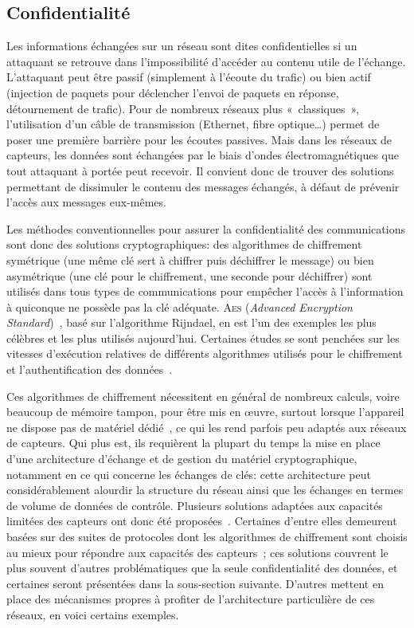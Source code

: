 \subsection{Confidentialité}

Les informations échangées sur un réseau sont dites confidentielles si un attaquant se retrouve dans l'impossibilité d'accéder au contenu utile de l'échange.
L'attaquant peut être passif (simplement à l'écoute du trafic) ou bien actif (injection de paquets pour déclencher l'envoi de paquets en réponse, détournement de trafic).
Pour de nombreux réseaux plus « classiques », l'utilisation d'un câble de transmission (Ethernet, fibre optique\dots) permet de poser une première barrière pour les écoutes passives.
Mais dans les réseaux de capteurs, les données sont échangées par le biais d'ondes électromagnétiques que tout attaquant à portée peut recevoir.
Il convient donc de trouver des solutions permettant de dissimuler le contenu des messages échangés, à défaut de prévenir l'accès aux messages eux-mêmes.

Les méthodes conventionnelles pour assurer la confidentialité des communications sont donc des solutions cryptographiques: des algorithmes de chiffrement symétrique (une même clé sert à chiffrer puis déchiffrer le message) ou bien asymétrique (une clé pour le chiffrement, une seconde pour déchiffrer) sont utilisés dans tous types de communications pour empêcher l'accès à l'information à quiconque ne possède pas la clé adéquate.
\textsc{Aes} (\textit{Advanced Encryption Standard})~\cite{aes}, basé sur l'algorithme Rijndael, en est l'un des exemples les plus célèbres et les plus utilisés aujourd'hui.
Certaines études se sont penchées sur les vitesses d'exécution relatives de différents algorithmes utilisés pour le chiffrement et l'authentification des données~\cite{SOBMCN11}.

Ces algorithmes de chiffrement nécessitent en général de nombreux calculs, voire beaucoup de mémoire tampon, pour être mis en œuvre, surtout lorsque l'appareil ne dispose pas de matériel dédié~\cite{PLP06}, ce qui les rend parfois peu adaptés aux réseaux de capteurs.
Qui plus est, ils requièrent la plupart du temps la mise en place d'une architecture d'échange et de gestion du matériel cryptographique, notamment en ce qui concerne les échanges de clés: cette architecture peut considérablement alourdir la structure du réseau ainsi que les échanges en termes de volume de données de contrôle.
Plusieurs solutions adaptées aux capacités limitées des capteurs ont donc été proposées~\cite{OX09}.
Certaines d'entre elles demeurent basées sur des suites de protocoles dont les algorithmes de chiffrement sont choisis au mieux pour répondre aux capacités des capteurs~\cite{SOBMCN11}; ces solutions couvrent le plus souvent d'autres problématiques que la seule confidentialité des données, et certaines seront présentées dans la sous-section suivante.
D'autres mettent en place des mécanismes propres à profiter de l'architecture particulière de ces réseaux, en voici certains exemples.

